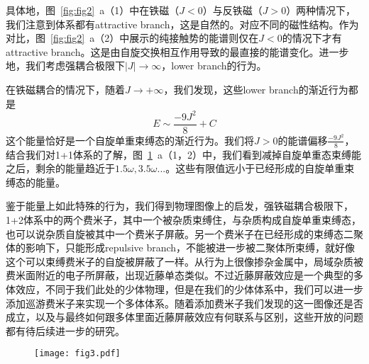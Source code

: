 具体地，图~\ref{fig:fig2}~a（1）中在铁磁（$J<0$）与反铁磁（$J>0$）两种情况下，我们注意到体系都有attractive branch，这是自然的。对应不同的磁性结构。作为对比，图~\ref{fig:fig2}~a（2）中展示的纯接触势的能谱则仅在$J<0$的情况下才有attractive branch。这是由自旋交换相互作用导致的最直接的能谱变化。进一步地，我们考虑强耦合极限下$|J|\to \infty$，lower branch的行为。

在铁磁耦合的情况下，随着$J\to+\infty$，我们发现，这些lower branch的渐近行为都是
\begin{equation}
E\sim\frac{-9J^2}{8}+C
\end{equation}
这个能量恰好是一个自旋单重束缚态的渐近行为。我们将$J>0$的能谱偏移$\frac{-9J^2}{8}$，结合我们对1+1体系的了解，图~\ref{fig:fig3}~a（1，2）中，我们看到减掉自旋单重态束缚能之后，剩余的能量趋近于$1.5\omega,3.5\omega...$。这些有限值远小于已经形成的自旋单重束缚态的能量。

鉴于能量上如此特殊的行为，我们得到物理图像上的启发，强铁磁耦合极限下，1+2体系中的两个费米子，其中一个被杂质束缚住，与杂质构成自旋单重束缚态，也可以说杂质自旋被其中一个费米子屏蔽。另一个费米子在已经形成的束缚态二聚体的影响下，只能形成repulsive branch，不能被进一步被二聚体所束缚，就好像这个可以束缚费米子的自旋被屏蔽了一样。从行为上很像掺杂金属中，局域杂质被费米面附近的电子所屏蔽，出现近藤单态类似\cite{mahanmany}。不过近藤屏蔽效应是一个典型的多体效应，不同于我们此处的少体物理，但是在我们的少体体系中，我们可以进一步添加巡游费米子来实现一个多体体系。随着添加费米子我们发现的这一图像还是否成立，以及与最终如何跟多体里面近藤屏蔽效应有何联系与区别，这些开放的问题都有待后续进一步的研究。

\begin{figure}[!htbp]
    \centering
    \texttt{[image: fig3.pdf]}
    \label{fig:fig3}
\end{figure}

